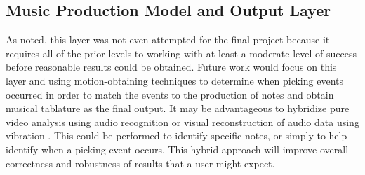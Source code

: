 \subsection{Music Production Model and Output Layer}
As noted, this layer was not even attempted for the final project because it requires all of the prior
levels to working with at least a moderate level of success before reasonable results could be obtained.
Future work would focus on this layer and using motion-obtaining techniques to determine when picking
events occurred in order to match the events to the production of notes and obtain musical tablature as
the final output. It may be advantageous to hybridize pure video analysis using audio recognition
or visual reconstruction of audio data using vibration \cite{VisualMic}.
This could be performed to identify specific notes, or simply to help identify when a picking event occurs.
This hybrid approach will improve overall correctness and robustness of results that a user might expect.
